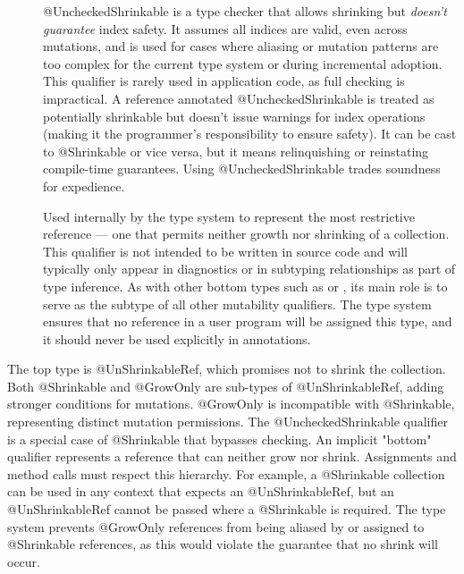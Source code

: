 \begin{description}
\item[]
  @UncheckedShrinkable is a type checker that allows shrinking but \emph{doesn't guarantee} index safety.
  It assumes all indices are valid, even across mutations, and is used for cases where aliasing or
  mutation patterns are too complex for the current type system or during incremental adoption.
  This qualifier is rarely used in application code, as full checking is impractical. A reference
  annotated @UncheckedShrinkable is treated as potentially shrinkable but doesn't issue warnings for
  index operations (making it the programmer’s responsibility to ensure safety). It can be cast to
  @Shrinkable or vice versa, but it means relinquishing or reinstating compile-time guarantees.
  Using @UncheckedShrinkable trades soundness for expedience.

\item[]
  Used internally by the type system to represent the most restrictive reference — one that
  permits neither growth nor shrinking of a collection. This qualifier is not intended
  to be written in source code and will typically only appear in diagnostics or in
  subtyping relationships as part of type inference. As with other bottom types such as
   or
  , its main role is to serve as
  the subtype of all other mutability qualifiers. The type system ensures that no
  reference in a user program will be assigned this type, and it should never be used
  explicitly in annotations.
\end{description}

The top type is @UnShrinkableRef, which promises not to shrink the
collection. Both @Shrinkable and @GrowOnly are sub-types of @UnShrinkableRef, adding stronger
conditions for mutations. @GrowOnly is incompatible with @Shrinkable, representing distinct
mutation permissions. The @UncheckedShrinkable qualifier is a special case of @Shrinkable that
bypasses checking. An implicit "bottom" qualifier represents a reference that can neither grow nor
shrink. Assignments and method calls must respect this hierarchy. For example, a @Shrinkable collection
can be used in any context that expects an @UnShrinkableRef, but an @UnShrinkableRef cannot be passed
where a @Shrinkable is required. The type system prevents @GrowOnly references from being aliased by or
assigned to @Shrinkable references, as this would violate the guarantee that no shrink will occur.

